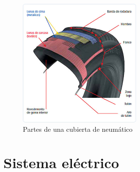 \documentclass[a4paper,12pt,oneside]{book}
\begin{document}
\begin{figure}[htbp]
\centering
\includegraphics[width=0.55\textwidth]{./img_0009/neumatico1.jpg}
\caption{Partes de una cubierta de neumático}
\end{figure}

\section{Sistema eléctrico}
\label{sec:orge0033db}
\end{document}
